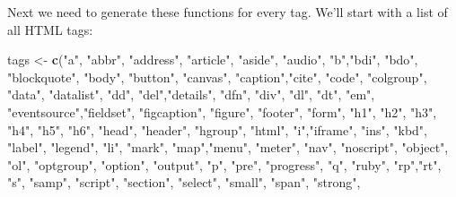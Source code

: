 \documentclass[]{book}
\newenvironment{Shaded}{\begin{snugshade}}{\end{snugshade}}
\newcommand{\KeywordTok}[1]{\textcolor[rgb]{0.27,0.27,0.27}{\textbf{#1}}}
\newcommand{\NormalTok}[1]{#1}
\newcommand{\StringTok}[1]{\textcolor[rgb]{0.5,0.5,0.5}{#1}}
\begin{document}
Next we need to generate these functions for every tag. We'll start with a list of all HTML tags:

\begin{Shaded}
\begin{Highlighting}[]
\NormalTok{tags <-}\StringTok{ }\KeywordTok{c}\NormalTok{(}\StringTok{"a"}\NormalTok{, }\StringTok{"abbr"}\NormalTok{, }\StringTok{"address"}\NormalTok{, }\StringTok{"article"}\NormalTok{, }\StringTok{"aside"}\NormalTok{, }\StringTok{"audio"}\NormalTok{,}
  \StringTok{"b"}\NormalTok{,}\StringTok{"bdi"}\NormalTok{, }\StringTok{"bdo"}\NormalTok{, }\StringTok{"blockquote"}\NormalTok{, }\StringTok{"body"}\NormalTok{, }\StringTok{"button"}\NormalTok{, }\StringTok{"canvas"}\NormalTok{,}
  \StringTok{"caption"}\NormalTok{,}\StringTok{"cite"}\NormalTok{, }\StringTok{"code"}\NormalTok{, }\StringTok{"colgroup"}\NormalTok{, }\StringTok{"data"}\NormalTok{, }\StringTok{"datalist"}\NormalTok{,}
  \StringTok{"dd"}\NormalTok{, }\StringTok{"del"}\NormalTok{,}\StringTok{"details"}\NormalTok{, }\StringTok{"dfn"}\NormalTok{, }\StringTok{"div"}\NormalTok{, }\StringTok{"dl"}\NormalTok{, }\StringTok{"dt"}\NormalTok{, }\StringTok{"em"}\NormalTok{,}
  \StringTok{"eventsource"}\NormalTok{,}\StringTok{"fieldset"}\NormalTok{, }\StringTok{"figcaption"}\NormalTok{, }\StringTok{"figure"}\NormalTok{, }\StringTok{"footer"}\NormalTok{,}
  \StringTok{"form"}\NormalTok{, }\StringTok{"h1"}\NormalTok{, }\StringTok{"h2"}\NormalTok{, }\StringTok{"h3"}\NormalTok{, }\StringTok{"h4"}\NormalTok{, }\StringTok{"h5"}\NormalTok{, }\StringTok{"h6"}\NormalTok{, }\StringTok{"head"}\NormalTok{, }\StringTok{"header"}\NormalTok{,}
  \StringTok{"hgroup"}\NormalTok{, }\StringTok{"html"}\NormalTok{, }\StringTok{"i"}\NormalTok{,}\StringTok{"iframe"}\NormalTok{, }\StringTok{"ins"}\NormalTok{, }\StringTok{"kbd"}\NormalTok{, }\StringTok{"label"}\NormalTok{,}
  \StringTok{"legend"}\NormalTok{, }\StringTok{"li"}\NormalTok{, }\StringTok{"mark"}\NormalTok{, }\StringTok{"map"}\NormalTok{,}\StringTok{"menu"}\NormalTok{, }\StringTok{"meter"}\NormalTok{, }\StringTok{"nav"}\NormalTok{,}
  \StringTok{"noscript"}\NormalTok{, }\StringTok{"object"}\NormalTok{, }\StringTok{"ol"}\NormalTok{, }\StringTok{"optgroup"}\NormalTok{, }\StringTok{"option"}\NormalTok{, }\StringTok{"output"}\NormalTok{,}
  \StringTok{"p"}\NormalTok{, }\StringTok{"pre"}\NormalTok{, }\StringTok{"progress"}\NormalTok{, }\StringTok{"q"}\NormalTok{, }\StringTok{"ruby"}\NormalTok{, }\StringTok{"rp"}\NormalTok{,}\StringTok{"rt"}\NormalTok{, }\StringTok{"s"}\NormalTok{, }\StringTok{"samp"}\NormalTok{,}
  \StringTok{"script"}\NormalTok{, }\StringTok{"section"}\NormalTok{, }\StringTok{"select"}\NormalTok{, }\StringTok{"small"}\NormalTok{, }\StringTok{"span"}\NormalTok{, }\StringTok{"strong"}\NormalTok{,}

\end{Highlighting}
\end{Shaded}
\end{document}
